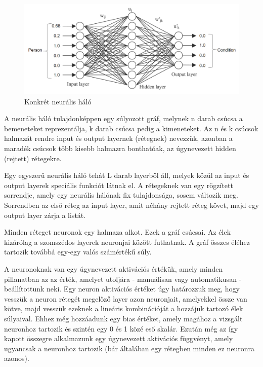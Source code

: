 \documentclass[12pt]{article}
\begin{document}
\begin{figure}[h!]
  \includegraphics[width=\linewidth]{fgv_network.png}
  \caption{Konkrét neurális háló}
\end{figure}


A neurális háló tulajdonképpen egy súlyozott gráf, melynek n darab csúcsa a bemeneteket reprezentálja, k darab csúcsa pedig a kimeneteket. Az n és k csúcsok halmazát rendre input és output layernek (rétegnek) nevezzük, azonban a maradék csúcsok több kisebb halmazra bonthatóak, az úgynevezett hidden (rejtett) rétegekre. 

Egy egyszerű neurális háló tehát L darab layerből áll, melyek közül az input és output layerek speciális funkciót látnak el. A rétegeknek van egy rögzített sorrendje, amely egy neurális hálónak fix tulajdonsága, sosem változik meg. Sorrendben az első réteg az input layer, amit néhány rejtett réteg követ, majd egy output layer zárja a listát.

Minden réteget neuronok egy halmaza alkot. Ezek a gráf csúcsai. Az élek kizárólag a szomszédos layerek neuronjai között futhatnak. A gráf összes éléhez tartozik továbbá egy-egy valós számértékű súly.

A neuronoknak van egy úgynevezett aktivációs értékük, amely minden pillanatban az az érték, amelyet utoljára - manuálisan vagy automatikusan - beállítottunk neki. Egy neuron aktivációs értéket úgy határozzuk meg, hogy vesszük a neuron rétegét megelőző layer azon neuronjait, amelyekkel össze van kötve, majd vesszük ezeknek a lineáris kombinációját a hozzájuk tartozó élek súlyaival. Ehhez még hozzáadunk egy bias értéket, amely magához a vizsgált neuronhoz tartozik és szintén egy 0 és 1 közé eső skalár.
Ezután még az így kapott összegre alkalmazunk egy úgynevezett aktivációs függvényt, amely ugyancsak a neuronhoz tartozik (bár általában egy rétegben minden ez neuronra azonos).
\end{document}
